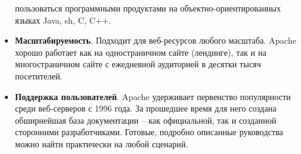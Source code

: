 \documentclass[14pt, a4paper]{article}
\begin{document}
\begin{itemize}
    пользоваться программными продуктами на объектно-ориентированных языках Java, sh, C, C++.
    \item \textbf{Масштабируемость}. Подходит для веб-ресурсов любого масштаба. Apache хорошо работает 
    как на одностраничном сайте (лендинге), так и на многостраничном сайте с ежедневной аудиторией в 
    десятки тысяч посетителей.
    \item \textbf{Поддержка пользователей}. Apache удерживает первенство популярности среди веб-серверов с 
    1996 года. За прошедшее время для него создана обширнейшая база документации – как официальной, так и 
    созданной сторонними разработчиками. Готовые, подробно описанные руководства можно найти практически 
    на любой сценарий.
\end{itemize}
\begin{figure}[h]%
    \centering
    \label{1.3}
\end{figure}
\end{document}
